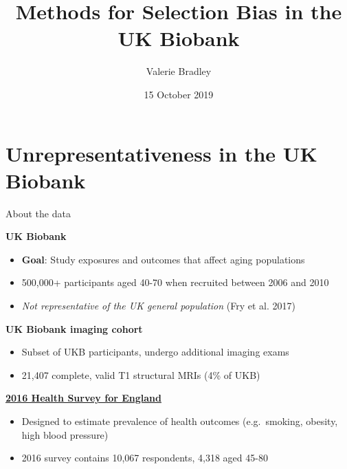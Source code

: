 \documentclass[
  ignorenonframetext,
]{beamer}
\institute[University of Oxford]{University of Oxford, Department of Statistics}
\title{Methods for Selection Bias in the UK Biobank}
\author{Valerie Bradley}
\date{15 October 2019}
\providecommand{\tightlist}{%
  \setlength{\itemsep}{0pt}\setlength{\parskip}{0pt}}
\begin{document}
\frame{\titlepage}

\begin{frame}
  \tableofcontents[hideallsubsections]
\end{frame}
\hypertarget{unrepresentativeness-in-the-uk-biobank}{%
\section{Unrepresentativeness in the UK
Biobank}\label{unrepresentativeness-in-the-uk-biobank}}

\begin{frame}{About the data}
\protect\hypertarget{about-the-data}{}

\textbf{UK Biobank}

\begin{itemize}
\tightlist
\item
  \textbf{Goal}: Study exposures and outcomes that affect aging
  populations
\item
  500,000+ participants aged 40-70 when recruited between 2006 and 2010
\item
  \emph{Not representative of the UK general population} (Fry et al.
  2017)
\end{itemize}

\textbf{UK Biobank imaging cohort}

\begin{itemize}
\tightlist
\item
  Subset of UKB participants, undergo additional imaging exams
\item
  21,407 complete, valid T1 structural MRIs (4\% of UKB)
\end{itemize}

\textbf{\href{https://digital.nhs.uk/data-and-information/publications/statistical/health-survey-for-england/health-survey-for-england-2016}{2016
Health Survey for England}}

\begin{itemize}
\tightlist
\item
  Designed to estimate prevalence of health outcomes (e.g.~smoking,
  obesity, high blood pressure)
\item
  2016 survey contains 10,067 respondents, 4,318 aged 45-80
\end{itemize}

\end{frame}
\end{document}
